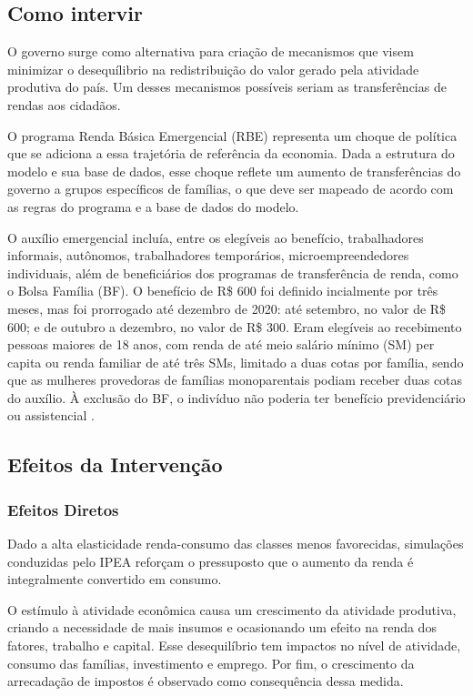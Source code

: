 \subsection{Como intervir}
O governo surge como alternativa para criação de mecanismos que visem minimizar o desequílibrio na redistribuição do valor gerado pela atividade produtiva do país. Um desses mecanismos possíveis seriam as transferências de rendas aos cidadãos.

O programa Renda Básica Emergencial (RBE) representa um choque de
política que se adiciona a essa trajetória de referência da economia. Dada a estrutura do modelo e sua base de dados, esse choque reflete um aumento de transferências do governo a grupos específicos de famílias, o que deve ser mapeado de acordo com as regras do programa e a base de dados do modelo. 

O auxílio emergencial incluía, entre os elegíveis ao benefício, trabalhadores informais, autônomos, trabalhadores temporários, microempreendedores individuais, além de  beneficiários dos programas de transferência de renda, como o Bolsa Família (BF). O benefício de R\$ 600 foi definido incialmente por três meses, mas foi prorrogado até dezembro de 2020: até setembro, no valor de R\$ 600; e de outubro a dezembro, no valor de R\$ 300. Eram elegíveis ao recebimento pessoas maiores de 18 anos, com renda de até meio salário mínimo (SM) per capita ou renda familiar de até três SMs, limitado a duas cotas por família, sendo que as mulheres provedoras de famílias monoparentais podiam receber duas cotas do auxílio. À exclusão do BF, o indivíduo não poderia ter benefício previdenciário ou assistencial \cite{auxilio}.



\subsection{Efeitos da Intervenção}

\subsubsection{Efeitos Diretos}

Dado a alta elasticidade renda-consumo das classes menos favorecidas, simulações conduzidas pelo IPEA reforçam o pressuposto que o aumento da renda é integralmente convertido em consumo.

O estímulo à atividade econômica causa um crescimento da atividade produtiva,  criando a necessidade de mais insumos e ocasionando um efeito na renda dos fatores, trabalho e capital. Esse desequilíbrio tem impactos no nível de atividade, consumo das famílias, investimento e emprego. Por fim, o crescimento da arrecadação de impostos é observado como consequência dessa medida.

